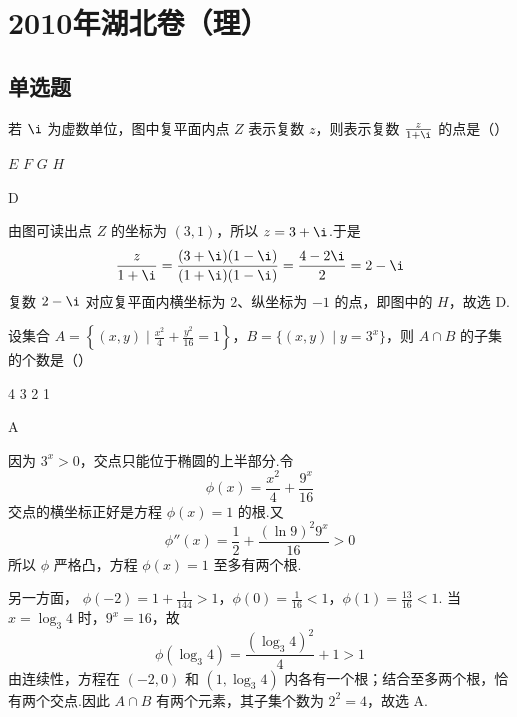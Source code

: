 
\chapter{2010年湖北卷（理）}

\section{单选题}

\begin{problem}
若 \(\i\) 为虚数单位，图中复平面内点 \(Z\) 表示复数 \(z\)，则表示复数 \(\frac{z}{1+\i}\) 的点是（\quad）


\choices
    {\(E\)}
    {\(F\)}
    {\(G\)}
    {\(H\)}
\end{problem}

\begin{answer}
D
\end{answer}

\begin{solution}
由图可读出点 \(Z\) 的坐标为 \((3,1)\)，所以 \(z=3+\i\).于是
\[
\frac{z}{1+\i}
=\frac{(3+\i)(1-\i)}{(1+\i)(1-\i)}
=\frac{4-2\i}{2}
=2-\i
\]
复数 \(2-\i\) 对应复平面内横坐标为 \(2\)、纵坐标为 \(-1\) 的点，即图中的 \(H\)，故选 D.
\end{solution}

\begin{problem}
设集合 \(A = \left\{(x, y) \mid \frac{x^2}{4} + \frac{y^2}{16} = 1\right\}\)，\(B = \{(x, y) \mid y = 3^x\}\)，则 \(A \cap B\) 的子集的个数是（\quad）

\choices
    {4}
    {3}
    {2}
    {1}
\end{problem}

\begin{answer}
A
\end{answer}

\begin{solution}
因为 \(3^x>0\)，交点只能位于椭圆的上半部分.令
\[
\phi(x)=\frac{x^2}{4}+\frac{9^x}{16}
\]
交点的横坐标正好是方程 \(\phi(x)=1\) 的根.又
\[
\phi''(x)=\frac12+\frac{(\ln9)^2 9^x}{16}>0
\]
所以 \(\phi\) 严格凸，方程 \(\phi(x)=1\) 至多有两个根.

另一方面，
\(\phi(-2)=1+\frac1{144}>1\)，\(\phi(0)=\frac1{16}<1\)，\(\phi(1)=\frac{13}{16}<1\).
当 \(x=\log_3 4\) 时，\(9^x=16\)，故
\[
\phi(\log_3 4)=\frac{(\log_3 4)^2}{4}+1>1
\]
由连续性，方程在 \((-2,0)\) 和 \((1,\log_3 4)\) 内各有一个根；结合至多两个根，恰有两个交点.因此 \(A\cap B\) 有两个元素，其子集个数为 \(2^2=4\)，故选 A.
\end{solution}

